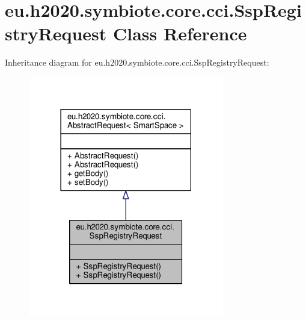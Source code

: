 \hypertarget{classeu_1_1h2020_1_1symbiote_1_1core_1_1cci_1_1SspRegistryRequest}{}\section{eu.\+h2020.\+symbiote.\+core.\+cci.\+Ssp\+Registry\+Request Class Reference}
\label{classeu_1_1h2020_1_1symbiote_1_1core_1_1cci_1_1SspRegistryRequest}


Inheritance diagram for eu.\+h2020.\+symbiote.\+core.\+cci.\+Ssp\+Registry\+Request\+:\nopagebreak
\begin{figure}[H]
\begin{center}
\leavevmode
\includegraphics[width=242pt]{classeu_1_1h2020_1_1symbiote_1_1core_1_1cci_1_1SspRegistryRequest__inherit__graph}
\end{center}
\end{figure}


